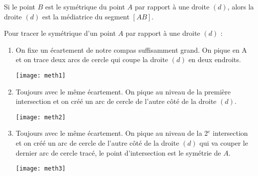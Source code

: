 	\begin{myprop}
	Si le point $B$ est le symétrique du point $A$ par rapport à une droite $(d)$, alors la droite $(d)$ est la médiatrice du segment $[AB]$.
\end{myprop}

\begin{mymeth}
	Pour tracer le symétrique d'un point $A$ par rapport à une droite $(d)$ :
	
	
	\begin{enumerate}
		
		
		\item  On fixe un écartement de notre compas suffisamment grand. On pique en A et on trace deux arcs de cercle qui coupe la droite $(d)$ en deux endroits.
		
		\begin{center}
			\texttt{[image: meth1]}
		\end{center}
		
		
		\item Toujours avec le même écartement. On pique au niveau de la première intersection et on créé un arc de cercle de l'autre côté de la droite $(d)$.
		
		\begin{center}
			\texttt{[image: meth2]}
		\end{center}
		\item Toujours avec le même écartement. On pique au niveau de la 2$^e$ intersection et on créé un arc de cercle de l'autre côté de la droite $(d)$ qui va couper le dernier arc de cercle tracé, le point d'intersection est le symétrie de $A$.
		
		\begin{center}
			\texttt{[image: meth3]}
		\end{center}
		
	\end{enumerate}
\end{mymeth}